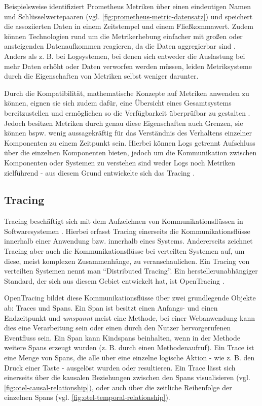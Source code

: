 Beispielsweise identifiziert Prometheus \cite{Prometheus} Metriken über einen eindeutigen Namen und Schlüsselwertepaaren (vgl. \autoref{fig:prometheus-metric-datensatz}) und speichert die assoziierten Daten in einem Zeitstempel und einem Fließkommawert. Zudem können Technologien rund um die Metrikerhebung einfacher mit großen oder ansteigenden Datenaufkommen reagieren, da die Daten aggregierbar sind \cite{DistributedSystemsObservability}. Anders als z. B. bei Logsystemen, bei denen sich entweder die Auslastung bei mehr Daten erhöht oder Daten verworfen werden müssen, leiden Metriksysteme durch die Eigenschaften von Metriken selbst weniger darunter.

Durch die Kompatibilität, mathematische Konzepte auf Metriken anwenden zu können, eignen sie sich zudem dafür, eine Übersicht eines Gesamtsystems bereitzustellen und ermöglichen so die Verfügbarkeit überprüfbar zu gestalten \cite{MultilevelObservabilityInCloudOrchestration} \cite{DistributedSystemsObservability}. Jedoch besitzen Metriken durch genau diese Eigenschaften auch Grenzen, sie können bspw. wenig aussagekräftig für das Verständnis des Verhaltens einzelner Komponenten zu einem Zeitpunkt sein. Hierbei können Logs getrennt Aufschluss über die einzelnen Komponenten bieten, jedoch um die Kommunikation zwischen Komponenten oder Systemen zu verstehen sind weder Logs noch Metriken zielführend - aus diesem Grund entwickelte sich das Tracing \cite{MultilevelObservabilityInCloudOrchestration} \cite{DistributedSystemsObservability}.

\subsection{Tracing}
\label{sec:tracing}

Tracing beschäftigt sich mit dem Aufzeichnen von Kommunikationsflüssen in Softwaresystemen \cite{TowardsPerformanceToolingInteroperability}. Hierbei erfasst Tracing einerseits die Kommunikationsflüsse innerhalb einer Anwendung bzw. innerhalb eines Systems. Andererseits zeichnet Tracing aber auch die Kommunikationsflüsse bei verteilten Systemen auf, um diese, meist komplexen Zusammenhänge, zu veranschaulichen. Ein Tracing von verteilten Systemen nennt man \enquote{Distributed Tracing}. Ein herstellerunabhängiger Standard, der sich aus diesem Gebiet entwickelt hat, ist OpenTracing \cite{OpenTracing}.

OpenTracing bildet diese Kommunikationsflüsse über zwei grundlegende Objekte ab: Traces und Spans. Ein Span ist besitzt einen Anfangs- und einen Endzeitpunkt und \textit{umspannt} meist eine Methode, bei einer Webanwendung kann dies eine Verarbeitung sein oder einen durch den Nutzer hervorgerufenen Eventfluss sein. Ein Span kann Kindspans beinhalten, wenn in der Methode weitere Spans erzeugt wurden (z. B. durch einen Methodenaufruf). Ein Trace ist eine Menge von Spans, die alle über eine einzelne logische Aktion - wie z. B. den Druck einer Taste - ausgelöst wurden oder resultieren. Ein Trace lässt sich einerseits über die kausalen Beziehungen zwischen den Spans visualisieren (vgl. \autoref{fig:otel-causal-relationship}), oder auch über die zeitliche Reihenfolge der einzelnen Spans (vgl. \autoref{fig:otel-temporal-relationship}).

